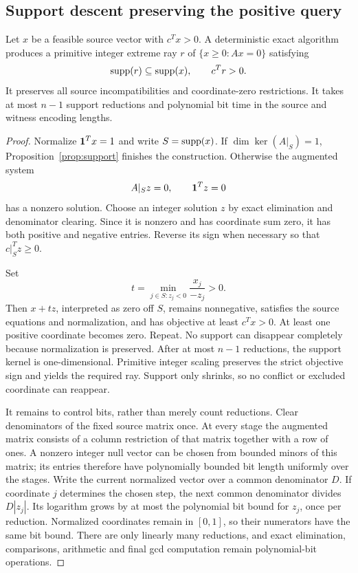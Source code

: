 \subsection{Support descent preserving the positive query}
\begin{theorem}
\label{thm:descent}
Let $x$ be a feasible source vector with $c^Tx>0$. A deterministic exact algorithm produces a primitive integer extreme ray $r$ of $\{x\ge0:Ax=0\}$ satisfying
\[
 \operatorname{supp}(r)\subseteq\operatorname{supp}(x),\qquad c^Tr>0.
\]
It preserves all source incompatibilities and coordinate-zero restrictions. It takes at most $n-1$ support reductions and polynomial bit time in the source and witness encoding lengths.
\end{theorem}
\begin{proof}
Normalize $\mathbf1^Tx=1$ and write $S=\operatorname{supp}(x)$. If $\dim\ker(A|_S)=1$, Proposition~\ref{prop:support} finishes the construction. Otherwise the augmented system
\[
 A|_S z=0,\qquad\mathbf1^Tz=0
\]
has a nonzero solution. Choose an integer solution $z$ by exact elimination and denominator clearing. Since it is nonzero and has coordinate sum zero, it has both positive and negative entries. Reverse its sign when necessary so that $c|_S^Tz\ge0$.

Set
\[
 t=\min_{j\in S:z_j<0}\frac{x_j}{-z_j}>0.
\]
Then $x+tz$, interpreted as zero off $S$, remains nonnegative, satisfies the source equations and normalization, and has objective at least $c^Tx>0$. At least one positive coordinate becomes zero. Repeat. No support can disappear completely because normalization is preserved. After at most $n-1$ reductions, the support kernel is one-dimensional. Primitive integer scaling preserves the strict objective sign and yields the required ray. Support only shrinks, so no conflict or excluded coordinate can reappear.

It remains to control bits, rather than merely count reductions. Clear denominators of the fixed source matrix once. At every stage the augmented matrix consists of a column restriction of that matrix together with a row of ones. A nonzero integer null vector can be chosen from bounded minors of this matrix; its entries therefore have polynomially bounded bit length uniformly over the stages. Write the current normalized vector over a common denominator $D$. If coordinate $j$ determines the chosen step, the next common denominator divides $D|z_j|$. Its logarithm grows by at most the polynomial bit bound for $z_j$, once per reduction. Normalized coordinates remain in $[0,1]$, so their numerators have the same bit bound. There are only linearly many reductions, and exact elimination, comparisons, arithmetic and final gcd computation remain polynomial-bit operations.
\end{proof}

